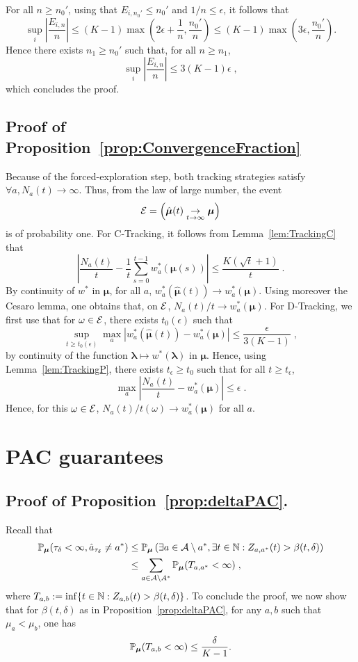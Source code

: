 \documentclass{colt2016} %
\begin{document}
For all $n\geq n_0'$, using that $E_{i,n_0'} \leq n_0'$ and $1/n \leq \epsilon$, it follows that 
\[\sup_i \left|\frac{E_{i,n}}{n}\right| \leq  (K-1) \max\left(2\epsilon + \frac{1}{n}, \frac{n_0'}{n}\right) \leq (K-1) \max\left(3\epsilon, \frac{n_0'}{n}\right).\]
Hence there exists $n_1 \geq n_0'$ such that, for all $n\geq n_1$, 
\[\sup_i \left|\frac{E_{i,n}}{n}\right| \leq  3(K-1) \epsilon\;,\]
which concludes the proof.


\subsection{Proof of Proposition~\ref{prop:ConvergenceFraction}}\label{proof:ConvergenceFraction}

Because of the forced-exploration step, both tracking strategies satisfy $\forall a, N_a(t) \rightarrow \infty$. Thus, from the law of large number, the event 
\[\mathcal{E} = \left(\hat{\bm\mu}(t) \underset{t \rightarrow \infty}{\rightarrow} \bm \mu\right)\]
is of probability one. 
For C-Tracking, it follows from Lemma~\ref{lem:TrackingC} that
\[\left|\frac{N_a(t)}{t} - \frac{1}{t}\sum_{s=0}^{t-1} w_a^*(\bm \mu(s))\right| \leq \frac{K(\sqrt{t} +1)}{t}\;.\]
By continuity of $w^*$ in $\bm \mu$, for all $a$, $w_a^*(\hat{\bm\mu}(t)) \rightarrow w^*_a(\bm\mu).$ Using moreover the Cesaro lemma, one obtains that, on $\mathcal{E}$, $N_a(t)/t \rightarrow w_a^*(\bm\mu)$.
For D-Tracking, we first use that for $\omega \in \mathcal{E}$, there exists $t_0(\epsilon)$ such that 
\[\sup_{t \geq t_0(\epsilon)} \max_ a |w_a^*(\hat{\bm\mu}(t)) - w_a^*(\bm \mu)| \leq \frac{\epsilon}{3(K-1)}\;,\]
by continuity of the function $\bm \lambda \mapsto w^*(\bm \lambda)$ in $\bm \mu$. Hence, using Lemma~\ref{lem:TrackingP}, there exists $t_\epsilon \geq t_0$ such that for all $t \geq t_\epsilon$, 
\[\max_a\left| \frac{N_a(t)}{t} - w_a^*(\bm \mu) \right| \leq \epsilon\;.\]
Hence, for this $\omega \in \mathcal{E}$,  $N_a(t) / t (\omega) \rightarrow w_a^*(\bm \mu)$ for all $a$. 


\section{PAC guarantees}\label{proof:deltaPAC}


\subsection{Proof of Proposition~\ref{prop:deltaPAC}.}\label{sec:proof:deltaPAC}
Recall that 
\begin{align*}
\mathbb{P}_{\bm \mu}(\tau_\delta<\infty,\hat{a}_{\tau_\delta}\neq a^*) & \leq \mathbb{P}_{\bm \mu}\left(\exists a \in \mathcal{A}\setminus a^*, \exists t \in \mathbb{N} : Z_{a,a^*}(t) > \beta(t,\delta)\right) \\& \leq \sum_{a\in \mathcal{A}\setminus A^*} \mathbb{P}_{\bm \mu}(T_{a,a^*} < \infty)\;,
\end{align*}
where $T_{a,b} := \inf\{ t\in \mathbb{N} : Z_{a,b}(t) > \beta(t,\delta)\}$. To conclude the proof, we now show that for $\beta(t,\delta)$ as in Proposition~\ref{prop:deltaPAC}, for any $a,b$ such that $\mu_a<\mu_b$, one has 
\[\mathbb{P}_{\bm \mu}(T_{a,b} < \infty) \leq \frac{\delta}{K-1}.\]
\end{document}
